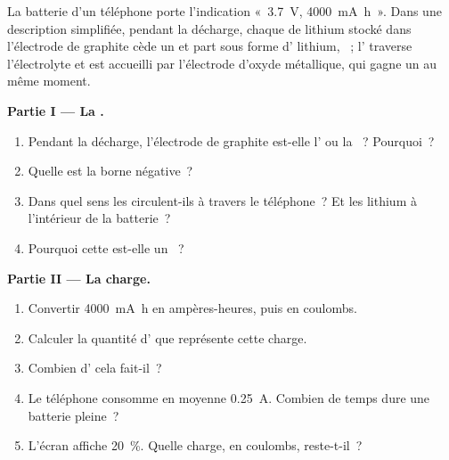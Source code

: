 \begin{problem}
\label{pb:g12:cells-and-electrolysis:1}
La batterie d'un téléphone porte l'indication «~\qty{3.7}{V},
\qty{4000}{mA.h}~». Dans une description simplifiée, pendant la
décharge, chaque  de lithium stocké dans l'électrode de graphite
cède un  et part sous forme d' lithium,
~; l' traverse l'électrolyte et est accueilli par
l'électrode d'oxyde métallique, qui gagne un  au même moment.

\medskip
\noindent\textbf{Partie I --- La .}
\begin{enumerate}
  \item Pendant la décharge, l'électrode de graphite est-elle l' ou
        la ~? Pourquoi~?
  \item Quelle est la borne négative~?
  \item Dans quel sens les  circulent-ils à travers le
        téléphone~? Et les  lithium à l'intérieur de la batterie~?
  \item Pourquoi cette  est-elle un ~?
\end{enumerate}

\medskip
\noindent\textbf{Partie II --- La charge.}
\begin{enumerate}[resume]
  \item Convertir \qty{4000}{mA.h} en ampères-heures, puis en coulombs.
  \item Calculer la quantité d' que représente cette charge.
  \item Combien d' cela fait-il~?
  \item Le téléphone consomme en moyenne \qty{0.25}{A}. Combien de temps
        dure une batterie pleine~?
  \item L'écran affiche 20~\%. Quelle charge, en coulombs, reste-t-il~?
\end{enumerate}


\end{problem}
